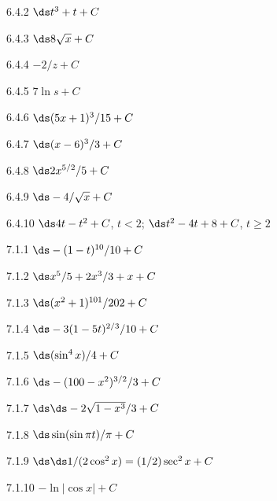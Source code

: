 \begin{Answer}{6.4.2}
 $\ds t^3+t+C$
\end{Answer}
\begin{Answer}{6.4.3}
 $\ds 8\sqrt{x}+C$
\end{Answer}
\begin{Answer}{6.4.4}
 $-2/z+C$
\end{Answer}
\begin{Answer}{6.4.5}
 $7\ln s+C$
\end{Answer}
\begin{Answer}{6.4.6}
 $\ds (5x+1)^3/15+C$
\end{Answer}
\begin{Answer}{6.4.7}
 $\ds (x-6)^3/3+C$
\end{Answer}
\begin{Answer}{6.4.8}
 $\ds 2x^{5/2}/5+C$
\end{Answer}
\begin{Answer}{6.4.9}
 $\ds -4/\sqrt{x}+C$
\end{Answer}
\begin{Answer}{6.4.10}
 $\ds 4t-t^2+C$, $t<2$; $\ds t^2-4t+8+C$, $t\ge 2$
\end{Answer}
\begin{Answer}{7.1.1}
 $\ds -(1-t)^{10}/10+C$
\end{Answer}
\begin{Answer}{7.1.2}
 $\ds x^5/5+2x^3/3+x+C$
\end{Answer}
\begin{Answer}{7.1.3}
 $\ds (x^2+1)^{101}/202+C$
\end{Answer}
\begin{Answer}{7.1.4}
 $\ds -3(1-5t)^{2/3}/10+C$
\end{Answer}
\begin{Answer}{7.1.5}
 $\ds (\sin^4x)/4+C$
\end{Answer}
\begin{Answer}{7.1.6}
 $\ds -(100-x^2)^{3/2}/3+C$
\end{Answer}
\begin{Answer}{7.1.7}
 $\ds \ds -2\sqrt{1-x^3}/3+C$
\end{Answer}
\begin{Answer}{7.1.8}
 $\ds \sin(\sin\pi t)/\pi+C$
\end{Answer}
\begin{Answer}{7.1.9}
 $\ds \ds 1/(2\cos^2 x)=(1/2)\sec^2x+C$
\end{Answer}
\begin{Answer}{7.1.10}
 $-\ln|\cos x|+C$
\end{Answer}
